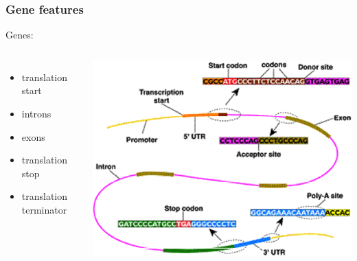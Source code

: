 %
\begin{frame}
  \frametitle{Gene features}
  \textcolor{hutton_blue}{Genes:}
  \begin{columns}[T] 
      \begin{itemize}
        \item translation start
        \item introns
        \item exons
        \item translation stop
        \item translation terminator
      \end{itemize}
      \includegraphics[width=\textwidth]{images/gene_feature}
  \end{columns}    
\end{frame}